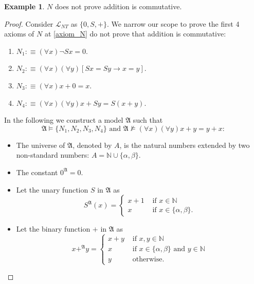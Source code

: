 \documentclass[11pt,letterpaper]{book}
\theoremstyle{definition}
\newtheorem{example}{Example}[section]
\begin{document}
\begin{example}
\label{example:N_not_commutative}
$N$ does not prove addition is commutative.

\begin{proof}
Consider $\mathcal{L}_{NT}$ as $\{0, S, + \}$. We narrow our scope to prove the first 4 axioms of $N$ at \ref{axiom_N} do not prove that addition is commutative:
\begin{enumerate}
\item{$N_1 : \equiv (\forall x) \lnot S x = 0$.}
\item{$N_2 : \equiv (\forall x)(\forall y) [Sx = Sy \rightarrow x = y] $.}
\item{$N_3 : \equiv  (\forall x) x + 0 = x $.}
\item{$N_4 : \equiv (\forall x)(\forall y)x + Sy = S(x+y) $.}
\end{enumerate}

In the following we construct a model $\mathfrak{A}$ such that
$$ \mathfrak{A} \models \{ N_1, N_2, N_3, N_4 \} \text{ and } \mathfrak{A} \not \models (\forall x) (\forall y) x + y = y + x :$$
\begin{itemize}
\item{The universe of $\mathfrak{A}$, denoted by $A$, is the natural numbers extended by two non-standard numbers: $A = \mathbb{N} \cup \{ \alpha, \beta \} $. }
\item{The constant $0^{\mathfrak{A}} = 0$.}
\item{Let the unary function $S$ in $\mathfrak{A}$ as
\begin{equation}
S^{\mathfrak{A}} (x) =
\begin{cases}
x+1 & \text{ if } x \in \mathbb{N} \\
x & \text{ if } x \in \{ \alpha, \beta \}.
\end{cases}
\nonumber
\end{equation}
}
\item{Let the binary function $+$ in $\mathfrak{A}$ as
\begin{equation}
x +^{\mathfrak{A}} y = 
\begin{cases}
x + y & \text{ if }x,y \in \mathbb{N} \\
x & \text{ if } x \in \{ \alpha, \beta \} \text{ and } y \in \mathbb{N} \\
y & \text{ otherwise.}
\end{cases}
\nonumber
\end{equation}

}
\end{itemize}


\end{proof}
\end{example}
\end{document}

